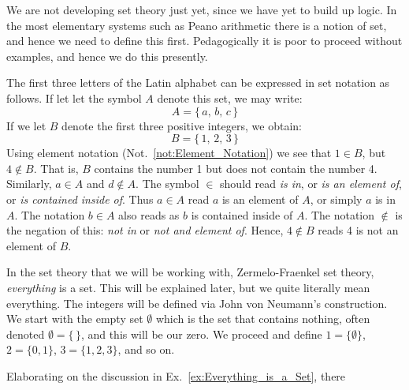         We are not developing set theory just yet, since we have yet to build up
        logic. In the most elementary systems such as Peano arithmetic
        there is a notion of set, and hence we need to define this first.
        Pedagogically it is poor to proceed without examples, and hence we do
        this presently.
        \begin{example}
            The first three letters of the Latin alphabet can be expressed in
            set notation as follows. If let let the symbol $A$ denote this set,
            we may write:
            \begin{equation}
                A=\{\,a,\,b,\,c\,\}
            \end{equation}
            If we let $B$ denote the first three positive integers, we obtain:
            \begin{equation}
                B=\{\,1,\,2,\,3\,\}
            \end{equation}
            Using element notation (Not.~\ref{not:Element_Notation}) we see that
            $1\in{B}$, but $4\notin{B}$. That is, $B$ contains the number 1 but
            does not contain the number 4. Similarly, $a\in{A}$ and
            $d\notin{A}$. The symbol $\in$ should read \textit{is in}, or
            \textit{is an element of}, or \textit{is contained inside of}. Thus
            $a\in{A}$ read $a$ is an element of $A$, or simply $a$ is in $A$.
            The notation $b\in{A}$ also reads as $b$ is contained inside of $A$.
            The notation $\notin$ is the negation of this: \textit{not in} or
            \textit{not and element of}. Hence, $4\notin{B}$ reads 4 is not an
            element of $B$.
        \end{example}
        \begin{example}
            \label{ex:Everything_is_a_Set}%
            In the set theory that we will be working with, Zermelo-Fraenkel set
            theory, \textit{everything} is a set. This will be explained later,
            but we quite literally mean everything. The integers will be defined
            via John von Neumann's construction. We
            start with the empty set $\emptyset$ which is the set that contains
            nothing, often denoted $\emptyset=\{\,\}$, and this will be our
            zero. We proceed and define $1=\{\emptyset\}$, $2=\{0,1\}$,
            $3=\{1,2,3\}$, and so on.
        \end{example}
        Elaborating on the discussion in Ex.~\ref{ex:Everything_is_a_Set}, there
